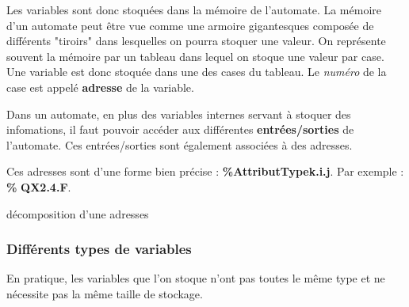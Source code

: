 \documentclass[11pt]{article}
\begin{document}

Les variables sont donc stoquées dans la mémoire de l'automate. La mémoire d'un automate peut être vue comme une armoire gigantesques composée de différents "tiroirs" dans lesquelles on pourra stoquer une valeur. On représente souvent la mémoire par un tableau dans lequel on stoque une valeur par case. Une variable est donc stoquée dans une des cases du tableau. Le \textit{numéro} de la case est appelé \textbf{adresse} de la variable.


Dans un automate, en plus des variables internes servant à stoquer des infomations, il faut pouvoir accéder aux différentes \textbf{entrées/sorties} de l'automate. Ces entrées/sorties sont également associées à des adresses.

Ces adresses sont d'une forme bien précise : \textbf{\%}\textbf{\color{green}Attribut}\textbf{\color{red}Type}\textbf{\color{blue}k.i.j}. Par exemple : \textbf{\%}\textbf{\color{green} Q}\textbf{\color{red}X}\textbf{\color{blue}2.4.F}.

\begin{table}[hb]
\centering
	
	\caption{décomposition d'une adresses}
\end{table}


\subsubsection{Différents types de variables}
En pratique, les variables que l'on stoque n'ont pas toutes le même type et ne nécessite pas la même taille de stockage.
\end{document}
